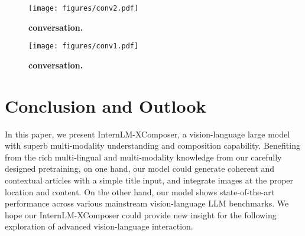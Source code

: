 \documentclass[10pt,twocolumn,letterpaper]{article}
\begin{document}
\begin{figure*}[t!]
	\centering
	\texttt{[image: figures/conv2.pdf]}
	\caption{\textbf{conversation.} }
	\label{fig:conv2}
\end{figure*}

\begin{figure*}[t!]
	\centering
	\texttt{[image: figures/conv1.pdf]}
	\caption{\textbf{conversation.} }
	\label{fig:conv1}
\end{figure*} \section{Conclusion and Outlook}
In this paper, we present InternLM-XComposer, a vision-language large model with superb multi-modality understanding and composition capability. Benefiting from the rich multi-lingual and multi-modality knowledge from our carefully designed pretraining, on one hand, our model could generate coherent and contextual articles with a simple title input, and integrate images at the proper location and content. On the other hand, our model shows state-of-the-art performance across various mainstream vision-language LLM benchmarks. We hope our InternLM-XComposer could provide new insight for the following exploration of advanced vision-language interaction. 




{\small


}
\end{document}
